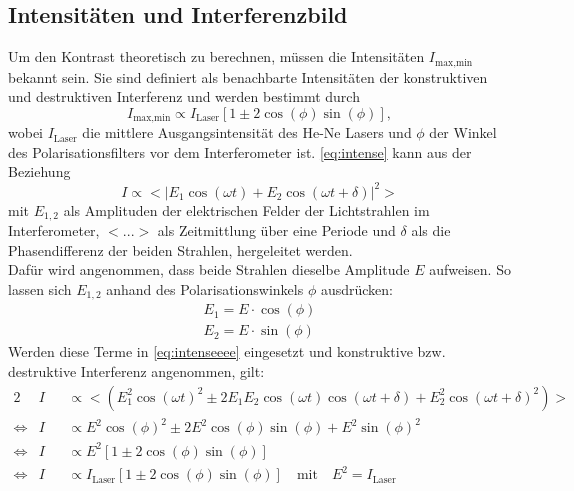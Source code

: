 \subsection{Intensitäten und Interferenzbild}
Um den Kontrast theoretisch zu berechnen, müssen die Intensitäten $I_{\text{max,min}}$ bekannt sein.
Sie sind definiert als benachbarte Intensitäten der konstruktiven und destruktiven Interferenz und werden bestimmt durch
\begin{equation}
    I_{\text{max,min}} \propto I_{\text{Laser}}\left[1 \pm 2\cos\left(\phi\right)\sin\left(\phi\right)\right],
    \label{eq:intense}
\end{equation}
wobei $I_{\text{Laser}}$ die mittlere Ausgangsintensität des He-Ne Lasers und $\phi$ der Winkel des Polarisationsfilters vor dem Interferometer ist.
\autoref{eq:intense} kann aus der Beziehung
\begin{equation}
    I \propto <|E_1\cos\left(\omega t\right) + E_2\cos\left(\omega t + \delta\right)|^2>
    \label{eq:intenseeee}
\end{equation}
mit $E_{1,2}$ als Amplituden der elektrischen Felder der Lichtstrahlen im Interferometer, $<...>$ als Zeitmittlung über eine Periode und $\delta$ als die Phasendifferenz der beiden Strahlen, hergeleitet werden.\\
Dafür wird angenommen, dass beide Strahlen dieselbe Amplitude $E$ aufweisen.
So lassen sich $E_{1,2}$ anhand des Polarisationswinkels $\phi$ ausdrücken:
\begin{align}
    E_1 = E\cdot \cos\left(\phi\right)\\
    E_2 = E\cdot \sin\left(\phi\right)
\end{align}
Werden diese Terme in \autoref{eq:intenseeee} eingesetzt und konstruktive bzw. destruktive Interferenz angenommen, gilt:
\begin{alignat}{2}
    &I &&\propto <\left(E_1^2\cos\left(\omega t\right)^2 \pm 2E_1E_2\cos\left(\omega t\right)\cos\left(\omega t + \delta\right) + E_2^2\cos\left(\omega t + \delta\right)^2\right)>\\
    \iff &I &&\propto E^2\cos\left(\phi\right)^2 \pm 2E^2\cos\left(\phi\right)\sin\left(\phi\right) + E^2\sin\left(\phi\right)^2\\
    \iff &I &&\propto E^2\left[1 \pm 2\cos\left(\phi\right)\sin\left(\phi\right)\right]\\
    \iff &I &&\propto I_{\text{Laser}}\left[1 \pm 2\cos\left(\phi\right)\sin\left(\phi\right)\right] \quad \text{mit} \quad E^2 = I_{\text{Laser}}
\end{alignat}
